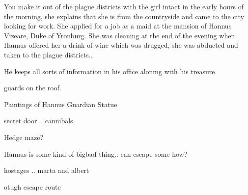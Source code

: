 
You make it out of the plague districts with the girl intact in the early hours of the morning, 
she explains that she is from the countryside and came to the city looking for work.  She applied for a job as a maid at 
the mansion of Hannus Vizeare, Duke of Yronburg.  She was cleaning at the end of the evening when Hannus offered her a 
drink of wine which was drugged, she was abducted and taken to the plague districts..

He keeps all sorts of information in his office alonmg with his treasure.


guards on the roof.

Paintings of Hannus
Guardian Statue

secret door...
cannibals

Hedge maze?


Hannus is some kind of bigbad thing.. can escape some how?

hostages .. marta and albert


otugh escape route
